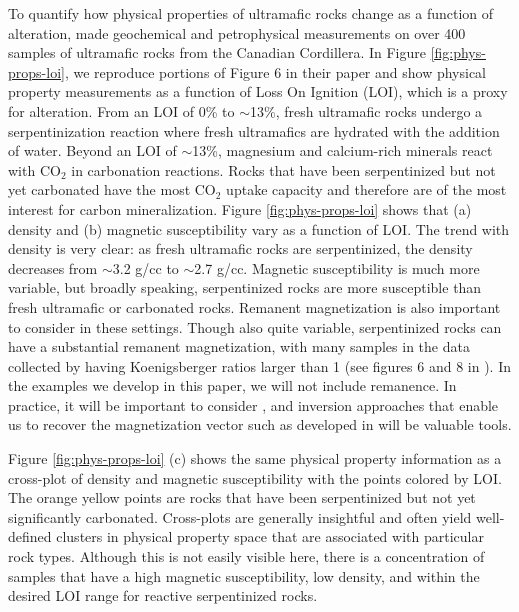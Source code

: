 \documentclass[
    paper,
  ]{geophysics}
\begin{document}
To quantify how physical properties of ultramafic rocks change as a function of alteration, \cite{Cutts2021} made geochemical and petrophysical measurements on over 400 samples of ultramafic rocks from the Canadian Cordillera. In Figure \ref{fig:phys-props-loi}, we reproduce portions of Figure 6 in their paper and show physical property measurements as a function of Loss On Ignition (LOI), which is a proxy for alteration. From an LOI of 0\% to $\sim$13\%, fresh ultramafic rocks undergo a serpentinization reaction where fresh ultramafics are hydrated with the addition of water. Beyond an LOI of $\sim$13\%, magnesium and calcium-rich minerals react with CO$_2$ in carbonation reactions. Rocks that have been serpentinized but not yet carbonated have the most CO$_2$ uptake capacity and therefore are of the most interest for carbon mineralization. Figure \ref{fig:phys-props-loi} shows that (a) density and (b) magnetic susceptibility vary as a function of LOI. The trend with density is very clear: as fresh ultramafic rocks are serpentinized, the density decreases from $\sim$3.2 g/cc to $\sim$2.7 g/cc. Magnetic susceptibility is much more variable, but broadly speaking, serpentinized rocks are more susceptible than fresh ultramafic or carbonated rocks. Remanent magnetization is also important to consider in these settings. Though also quite variable, serpentinized rocks can have a substantial remanent magnetization, with many samples in the data collected by \cite{Cutts2021} having Koenigsberger ratios larger than 1 (see figures 6 and 8 in \cite{Cutts2021}). In the examples we develop in this paper, we will not include remanence. In practice, it will be important to consider \citep{Mitchinson2020}, and inversion approaches that enable us to recover the magnetization vector such as developed in \cite{Fournier2020} will be valuable tools.






Figure  \ref{fig:phys-props-loi} (c) shows the same physical property information as a cross-plot of density and magnetic susceptibility with the points colored by LOI. The orange yellow points are rocks that have been serpentinized but not yet significantly carbonated. Cross-plots are generally insightful and often yield well-defined clusters in physical property space that are associated with particular rock types. Although this is not easily visible here, there is a concentration of samples that have a high magnetic susceptibility, low density, and within the  desired LOI range for reactive serpentinized rocks.
\end{document}
